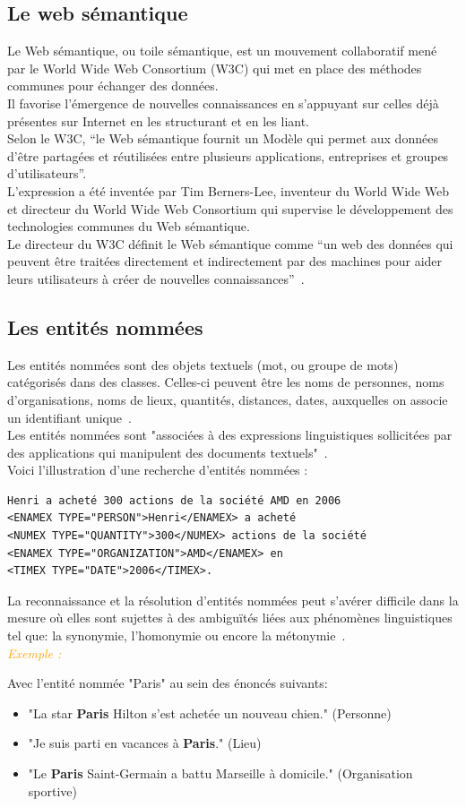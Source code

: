 \documentclass[a4paper, 11pt]{report}
\newenvironment{exemple}
    {
    \textit{\textcolor{orange}{
    Exemple : \\}}
    }
    {
    ~\\
    }
\begin{document}
\subsection{Le web sémantique}
Le Web sémantique, ou toile sémantique, est un mouvement collaboratif mené par le World Wide Web Consortium (W3C) qui met en place des méthodes communes pour échanger des données.\\
Il favorise l'émergence de nouvelles connaissances en s'appuyant sur celles déjà présentes sur Internet en les structurant et en les liant.\\
Selon le W3C, ``le Web sémantique fournit un Modèle qui permet aux données d'être partagées et réutilisées entre plusieurs applications, entreprises et groupes d'utilisateurs''.\\
L'expression a été inventée par Tim Berners-Lee, inventeur du World Wide Web et directeur du World Wide Web Consortium qui supervise le développement des technologies communes du Web sémantique. \\
Le directeur du W3C définit le Web sémantique comme ``un web des données qui peuvent être traitées directement et indirectement par des machines pour aider leurs utilisateurs à créer de nouvelles connaissances''~\cite{w1ws}.

\subsection{Les entités nommées}
Les entités nommées sont des objets textuels (mot, ou groupe de mots) catégorisés dans des classes. Celles-ci peuvent être les noms de personnes, noms d'organisations, noms de lieux, quantités, distances, dates, auxquelles on associe un identifiant unique~\cite{w2re}.\\
Les entités nommées sont "associées à des expressions linguistiques sollicitées par des applications qui manipulent des documents textuels"~\cite{DN12}.\\
Voici l'illustration d'une recherche d'entités nommées :
\begin{verbatim}
Henri a acheté 300 actions de la société AMD en 2006
<ENAMEX TYPE="PERSON">Henri</ENAMEX> a acheté 
<NUMEX TYPE="QUANTITY">300</NUMEX> actions de la société 
<ENAMEX TYPE="ORGANIZATION">AMD</ENAMEX> en 
<TIMEX TYPE="DATE">2006</TIMEX>.
\end{verbatim}
La reconnaissance et la résolution d'entités nommées peut s'avérer difficile dans la mesure où elles sont sujettes à des ambiguïtés liées aux phénomènes linguistiques tel que: la synonymie, l'homonymie ou encore la métonymie~\cite{DN12}.\\
\begin{exemple}
Avec l’entité nommée "Paris" au sein des énoncés suivants:
\begin{itemize}
\item "La star \textbf{Paris} Hilton s'est achetée un nouveau chien." (Personne)
\item "Je suis parti en vacances à \textbf{Paris}." (Lieu)
\item "Le \textbf{Paris} Saint-Germain a battu Marseille à domicile." (Organisation sportive)
\end{itemize}
\end{exemple}
\end{document}
